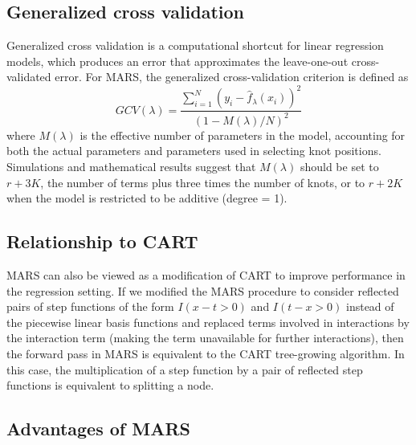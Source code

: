 \documentclass[12pt]{article}
\begin{document}

\subsection{Generalized cross validation} %
\label{sub:generalized_cross_validation}

Generalized cross validation is a computational shortcut for linear regression models, which produces an error that approximates the leave-one-out cross-validated error. For MARS, the generalized cross-validation criterion is defined as
\begin{equation}
  GCV(\lambda) = 
    \frac{
      \sum_{i = 1}^{N}(y_{i} - \hat{f}_{\lambda}(x_{i}))^2
    }{
      (1 - M(\lambda)/N)^2
    }
\end{equation}
where $M(\lambda)$ is the effective number of parameters in the model, accounting for both the actual parameters and parameters used in selecting knot positions. Simulations and mathematical results suggest that $M(\lambda)$ should be set to $r + 3K$, the number of terms plus three times the number of knots, or to $r + 2K$ when the model is restricted to be additive (degree = 1).


\subsection{Relationship to CART} %
\label{sub:relationship_to_cart}

MARS can also be viewed as a modification of CART to improve performance in the regression setting. If we modified the MARS procedure to consider reflected pairs of step functions of the form $I(x - t > 0)$ and $I(t - x > 0)$ instead of the piecewise linear basis functions and replaced terms involved in interactions by the interaction term (making the term unavailable for further interactions), then the forward pass in MARS is equivalent to the CART tree-growing algorithm. In this case, the multiplication of a step function by a pair of reflected step functions is equivalent to splitting a node.


\subsection{Advantages of MARS} %
\label{sub:advantages_of_mars}
\end{document}
